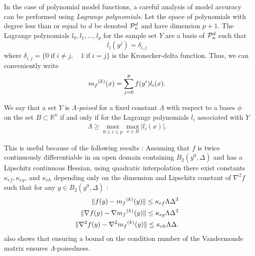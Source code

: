 In the case of polynomial model functions, a careful analysis of model accuracy can be performed using \emph{Lagrange polynomials}.
Let the space of polynomials with degree less than or equal to $d$ be denoted $\mathcal{P}^d_n$ and have dimension $p+1$.
The Lagrange polynomials $l_0, l_1, \ldots, l_p$ for the sample set $Y$ are a basis of $\mathcal{P}^d_n$ such that
\[
l_i(y^j) = \delta_{i,j}
\]
where $\delta_{i,j} = \{0 \;\text{if}\; i\ne j,\quad 1 \;\text{if} \; i = j \}$ is the Kronecker-delta function.
Thus, we can conveniently write
\[
\label{reg}
{{m}_f}^{(k)}(x) = \sum^p_{j=0}f(y^i)l_i(x).
\]

We say that a set $Y$ is \emph{$\Lambda$-poised} for a fixed constant $\Lambda$ with respect to a bases $\phi$ on the set 
$B \subset \mathbb R^n$ if and only if for the Lagrange polynomials $l_i$ associated with $Y$
\begin{align}
\Lambda \ge \max_{0\le i\le p}\max_{x\in B}|l_i(x)|.
\end{align}


This is useful because of the following results \cite{DUMMY:intro_book}:
Assuming that $f$ is twice continuously differentiable in an open domain containing $B_2(y^0, \Delta)$ and has a Lipschitz continuous Hessian, using quadratic interpolation there exist constants $\kappa_{ef}, \kappa_{eg}$, and $\kappa_{eh}$ depending only on the dimension and Lipschitz constant of $\nabla^2 f$ such that for any $y \in B_2(y^0, \Delta)$ :
\begin{align}
 \label{fully_quadratic}
 \|f(y) - {{m}_f}^{(k)}(y)\| \le \kappa_{ef} \Lambda \Delta^3 \\
 \|\nabla f(y) - \nabla {{m}_f}^{(k)}(y)\| \le \kappa_{eg} \Lambda \Delta^2 \\
 \|\nabla^2 f(y) - \nabla^2 {{m}_f}^{(k)}(y)\| \le \kappa_{eh}\Lambda \Delta .\\
\end{align}
\cite{DUMMY:intro_book} also shows that ensuring a bound on the condition number of the Vandermonde matrix ensures $\Lambda$-poisedness.

